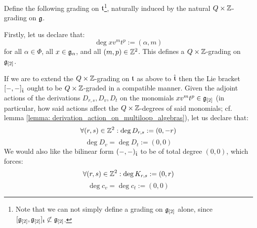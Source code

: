         \begin{proposition} \label{prop: root_grading_on_extended_toroidal_lie_algebras}
            Define the following grading on $\mathfrak{t}$\footnote{Note that we can not simply define a grading on $\mathfrak{g}_{[2]}$ alone, since $[\mathfrak{g}_{[2]}, \mathfrak{g}_{[2]}]_{\mathfrak{t}} \not \subset \mathfrak{g}_{[2]}$.}, naturally induced by the natural $Q \x \Z$-grading on $\mathfrak{g}$.
            
            Firstly, let us declare that:
                $$\deg x v^m t^p := (\alpha, m)$$
            for all $\alpha \in \Phi$, all $x \in \mathfrak{g}_{\alpha}$, and all $(m, p) \in \mathbb{Z}^2$. This defines a $Q \x \Z$-grading on $\mathfrak{g}_{[2]}$. 
            
            If we are to extend the $Q \x \Z$-grading on $\mathfrak{t}$ as above to $\hat{\mathfrak{t}}$ then the Lie bracket $[-, -]_{\hat{\mathfrak{t}}}$ ought to be $Q \x \Z$-graded in a compatible manner. Given the adjoint actions of the derivations $D_{r, s}, D_v, D_t$ on the monomials $x v^m t^p \in \mathfrak{g}_{[2]}$ (in particular, how said actions affect the $Q \x \Z$-degrees of said monomials; cf. lemma \ref{lemma: derivation_action_on_multiloop_algebras}), let us declare that:
                $$\forall (r, s) \in \mathbb{Z}^2: \deg D_{r, s} := (0, -r)$$
                $$\deg D_v = \deg D_t := (0, 0)$$
            We would also like the bilinear form $(-, -)_{\hat{\mathfrak{t}}}$ to be of total degree $(0, 0)$, which forces:
                $$\forall (r, s) \in \mathbb{Z}^2: \deg K_{r, s} := (0, r)$$
                $$\deg c_v = \deg c_t := (0, 0)$$
        \end{proposition}
